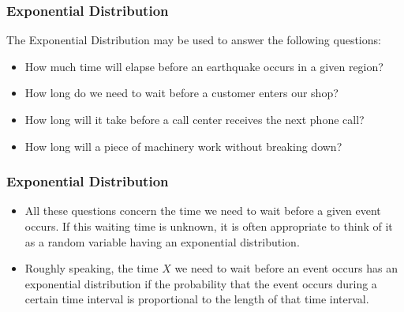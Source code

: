 



\begin{frame}[fragile]
\frametitle{Exponential Distribution}
The Exponential Distribution may be used to answer the following questions:
\begin{itemize}
\item How much time will elapse before an earthquake occurs in a given region?
\item How long do we need to wait before a customer enters our shop?
\item How long will it take before a call center receives the next phone call?
\item How long will a piece of machinery work without breaking down?
\end{itemize}
\end{frame}

\begin{frame}[fragile]
\frametitle{Exponential Distribution}

\begin{itemize}
\item All these questions concern the time we need to wait before a given event occurs. If this waiting time is unknown, it is often appropriate to think of it as a random variable having an exponential distribution.
\item Roughly speaking, the time $X$ we need to wait before an event occurs has an exponential distribution if the probability that the event occurs during a certain time interval is proportional to the length of that time interval.

\end{itemize}
\end{frame}

